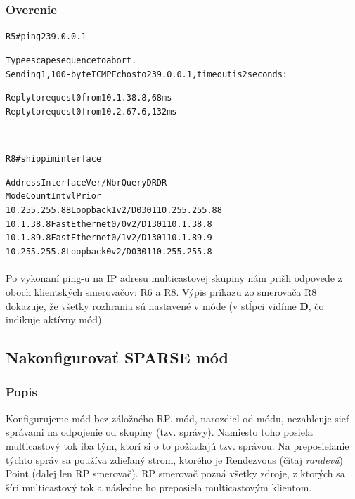 \documentclass[12pt,twoside,a4paper]{report}
\begin{document}
\subsubsection{Overenie}

\noindent
{\selectfont
\begin{small}
\begin{alltt}
R5#ping 239.0.0.1

Type escape sequence to abort.
Sending 1, 100-byte ICMP Echos to 239.0.0.1, timeout is 2 seconds:

Reply to request 0 from 10.1.38.8, 68 ms
Reply to request 0 from 10.2.67.6, 132 ms


----------------------------------------------------------------


R8#sh ip pim interface

Address          Interface         Ver/   Nbr    Query  DR     DR
                                   Mode   Count  Intvl  Prior
10.255.255.88    Loopback1         v2/D   0      30     1      10.255.255.88
10.1.38.8        FastEthernet0/0   v2/D   1      30     1      10.1.38.8
10.1.89.8        FastEthernet0/1   v2/D   1      30     1      10.1.89.9
10.255.255.8     Loopback0         v2/D   0      30     1      10.255.255.8

\end{alltt}
\end{small}
}

\paragraph{}
Po vykonaní ping-u na IP adresu multicastovej skupiny nám prišli odpovede z oboch klientských smerovačov: R6 a R8. Výpis príkazu  zo smerovača R8 dokazuje, že všetky rozhrania sú nastavené v  móde (v stĺpci  vidíme \textbf{D}, čo indikuje aktívny  mód).

\subsection{Nakonfigurovať SPARSE mód}
\subsubsection{Popis}
Konfigurujeme  mód bez záložného RP.  mód, narozdiel od  módu, nezahlcuje sieť správami na odpojenie od skupiny (tzv.  správy). Namiesto toho posiela multicastový tok iba tým, ktorí si o to požiadajú tzv.  správou. Na preposielanie týchto správ sa používa zdieľaný strom, ktorého  je Rendezvous (čítaj \textit{randevú}) Point (ďalej len RP smerovač). RP smerovač pozná všetky zdroje, z ktorých sa šíri  multicastový tok a následne ho preposiela multicastovým klientom.
\end{document}

